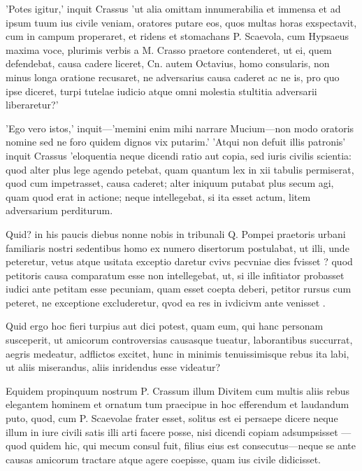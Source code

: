  'Potes igitur,' inquit Crassus 'ut alia omittam innumerabilia et immensa et ad ipsum tuum ius civile veniam, oratores putare eos, quos multas horas exspectavit, cum in campum properaret, et ridens et stomachans P. Scaevola, cum Hypsaeus maxima voce, plurimis verbis a M. Crasso praetore contenderet, ut ei, quem defendebat, causa cadere liceret, Cn. autem Octavius, homo consularis, non minus longa oratione recusaret, ne adversarius causa caderet ac ne is, pro quo ipse diceret, turpi tutelae iudicio atque omni molestia stultitia adversarii liberaretur?'

 'Ego vero istos,' inquit—'memini enim mihi narrare Mucium—non modo oratoris nomine sed ne foro quidem dignos vix putarim.' 'Atqui non defuit illis patronis' inquit Crassus 'eloquentia neque dicendi ratio aut copia, sed iuris civilis scientia: quod alter plus lege agendo petebat, quam quantum lex in xii tabulis permiserat, quod cum impetrasset, causa caderet; alter iniquum putabat plus secum agi, quam quod erat in actione; neque intellegebat, si ita esset actum, litem adversarium perditurum.

 Quid? in his paucis diebus nonne nobis in tribunali Q. Pompei praetoris urbani familiaris nostri sedentibus homo ex numero disertorum postulabat, ut illi, unde peteretur, vetus atque usitata exceptio daretur cvivs pecvniae dies fvisset ? quod petitoris causa comparatum esse non intellegebat, ut, si ille infitiator probasset iudici ante petitam esse pecuniam, quam esset coepta deberi, petitor rursus cum peteret, ne exceptione excluderetur, qvod ea res in ivdicivm ante venisset .

 Quid ergo hoc fieri turpius aut dici potest, quam eum, qui hanc personam susceperit, ut amicorum controversias causasque tueatur, laborantibus succurrat, aegris medeatur, adflictos excitet, hunc in minimis tenuissimisque rebus ita labi, ut aliis miserandus, aliis inridendus esse videatur?

 Equidem propinquum nostrum P. Crassum illum Divitem cum multis aliis rebus elegantem hominem et ornatum tum praecipue in hoc efferendum et laudandum puto, quod, cum P. Scaevolae frater esset, solitus est ei persaepe dicere neque illum in iure civili satis illi arti facere posse, nisi dicendi copiam adsumpsisset —quod quidem hic, qui mecum consul fuit, filius eius est consecutus—neque se ante causas amicorum tractare atque agere coepisse, quam ius civile didicisset.

